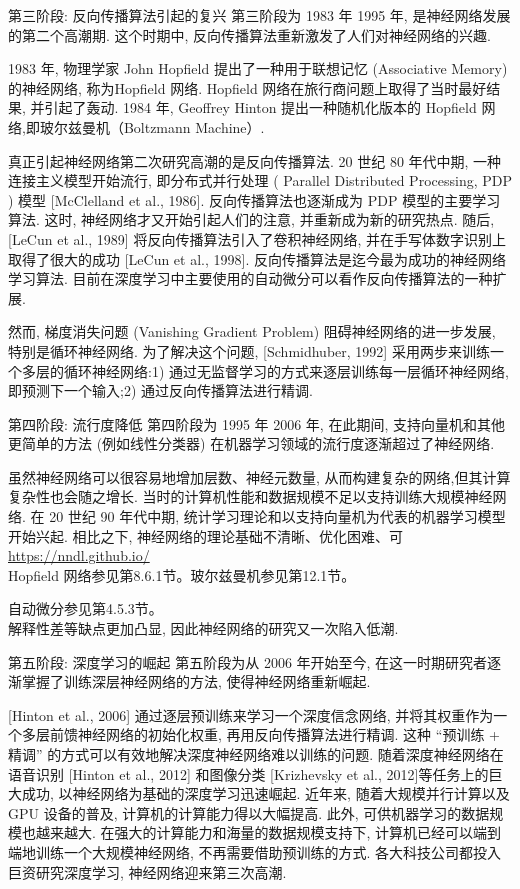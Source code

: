 \documentclass[10pt]{article}
\begin{document}
第三阶段: 反向传播算法引起的复兴 第三阶段为 1983 年 1995 年, 是神经网络发展的第二个高潮期. 这个时期中, 反向传播算法重新激发了人们对神经网络的兴趣.

1983 年, 物理学家 John Hopfield 提出了一种用于联想记忆 (Associative Memory) 的神经网络, 称为Hopfield 网络. Hopfield 网络在旅行商问题上取得了当时最好结果, 并引起了轰动. 1984 年, Geoffrey Hinton 提出一种随机化版本的 Hopfield 网络,即玻尔兹曼机（Boltzmann Machine）.

真正引起神经网络第二次研究高潮的是反向传播算法. 20 世纪 80 年代中期, 一种连接主义模型开始流行, 即分布式并行处理 ( Parallel Distributed Processing, PDP ) 模型 [McClelland et al., 1986]. 反向传播算法也逐渐成为 PDP 模型的主要学习算法. 这时, 神经网络才又开始引起人们的注意, 并重新成为新的研究热点. 随后, [LeCun et al., 1989] 将反向传播算法引入了卷积神经网络, 并在手写体数字识别上取得了很大的成功 [LeCun et al., 1998]. 反向传播算法是迄今最为成功的神经网络学习算法. 目前在深度学习中主要使用的自动微分可以看作反向传播算法的一种扩展.

然而, 梯度消失问题 (Vanishing Gradient Problem) 阻碍神经网络的进一步发展, 特别是循环神经网络. 为了解决这个问题, [Schmidhuber, 1992] 采用两步来训练一个多层的循环神经网络:1) 通过无监督学习的方式来逐层训练每一层循环神经网络,即预测下一个输入;2) 通过反向传播算法进行精调.

第四阶段: 流行度降低 第四阶段为 1995 年 2006 年, 在此期间, 支持向量机和其他更简单的方法 (例如线性分类器) 在机器学习领域的流行度逐渐超过了神经网络.

虽然神经网络可以很容易地增加层数、神经元数量, 从而构建复杂的网络,但其计算复杂性也会随之增长. 当时的计算机性能和数据规模不足以支持训练大规模神经网络. 在 20 世纪 90 年代中期, 统计学习理论和以支持向量机为代表的机器学习模型开始兴起. 相比之下, 神经网络的理论基础不清晰、优化困难、可 \href{https://nndl.github.io/}{https://nndl.github.io/}\\
Hopfield 网络参见第8.6.1节。玻尔兹曼机参见第12.1节。

自动微分参见第4.5.3节。\\
解释性差等缺点更加凸显, 因此神经网络的研究又一次陷入低潮.

第五阶段: 深度学习的崛起 第五阶段为从 2006 年开始至今, 在这一时期研究者逐渐掌握了训练深层神经网络的方法, 使得神经网络重新崛起.

[Hinton et al., 2006] 通过逐层预训练来学习一个深度信念网络, 并将其权重作为一个多层前馈神经网络的初始化权重, 再用反向传播算法进行精调. 这种 “预训练 + 精调” 的方式可以有效地解决深度神经网络难以训练的问题. 随着深度神经网络在语音识别 [Hinton et al., 2012] 和图像分类 [Krizhevsky et al., 2012]等任务上的巨大成功, 以神经网络为基础的深度学习迅速崛起. 近年来, 随着大规模并行计算以及 GPU 设备的普及, 计算机的计算能力得以大幅提高. 此外, 可供机器学习的数据规模也越来越大. 在强大的计算能力和海量的数据规模支持下, 计算机已经可以端到端地训练一个大规模神经网络, 不再需要借助预训练的方式. 各大科技公司都投入巨资研究深度学习, 神经网络迎来第三次高潮.
\end{document}
